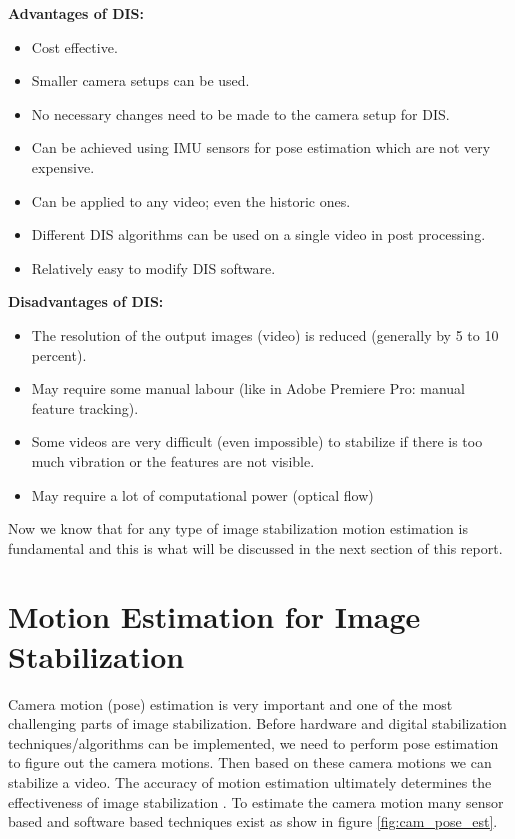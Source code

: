 \textbf{Advantages of DIS: }
\begin{itemize}
\item Cost effective.
\item Smaller camera setups can be used.
\item No necessary changes need to be made to the camera setup for DIS.
\item Can be achieved using IMU sensors for pose estimation which are not very expensive.
\item Can be applied to any video; even the historic ones.
\item Different DIS algorithms can be used on a single video in post processing.
\item Relatively easy to modify DIS software.
\end{itemize}

\textbf{Disadvantages of DIS:}
\begin{itemize}
\item The resolution of the output images (video) is reduced (generally by 5 to 10 percent).
\item May require some manual labour (like in Adobe Premiere Pro: manual feature tracking).
\item Some videos are very difficult (even impossible) to stabilize if there is too much vibration or the features are not visible.
\item May require a lot of computational power (optical flow)
\end{itemize}

Now we know that for any type of image stabilization motion estimation is fundamental and this is what will be discussed in the next section of this report.

\section{Motion Estimation for Image Stabilization}
\label{sec:pose_estimation}
Camera motion (pose) estimation is very important and one of the most challenging parts of image stabilization. Before hardware and digital stabilization techniques/algorithms can be implemented, we need to perform pose estimation to figure out the camera motions. Then based on these camera motions we can stabilize a video. The accuracy of motion estimation ultimately determines the effectiveness of image stabilization \citep{ryu2012robust}. To estimate the camera motion many sensor based and software based techniques exist as show in figure \ref{fig:cam_pose_est}.

